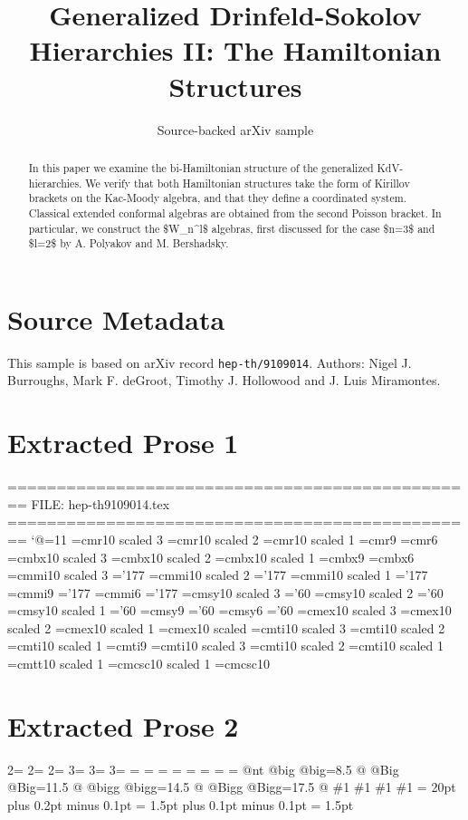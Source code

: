 \documentclass[11pt]{article}
\title{Generalized Drinfeld-Sokolov Hierarchies II: The Hamiltonian Structures}
\author{Source-backed arXiv sample}
\date{}
\begin{document}
\maketitle
\begin{abstract}
In this paper we examine the bi-Hamiltonian structure of the generalized KdV-hierarchies. We verify that both Hamiltonian structures take the form of Kirillov brackets on the Kac-Moody algebra, and that they define a coordinated system. Classical extended conformal algebras are obtained from the second Poisson bracket. In particular, we construct the \$W\_n\textasciicircum{}l\$ algebras, first discussed for the case \$n=3\$ and \$l=2\$ by A. Polyakov and M. Bershadsky.
\end{abstract}
\section{Source Metadata}
This sample is based on arXiv record \texttt{hep-th/9109014}. Authors: Nigel J. Burroughs, Mark F. deGroot, Timothy J. Hollowood and J. Luis Miramontes.
\section{Extracted Prose 1}
================================================ FILE: hep-th9109014.tex ================================================ `@=11 =cmr10 scaled 3 =cmr10 scaled 2 =cmr10 scaled 1 =cmr9 =cmr6 =cmbx10 scaled 3 =cmbx10 scaled 2 =cmbx10 scaled 1 =cmbx9 =cmbx6 =cmmi10 scaled 3 ='177 =cmmi10 scaled 2 ='177 =cmmi10 scaled 1 ='177 =cmmi9 ='177 =cmmi6 ='177 =cmsy10 scaled 3 ='60 =cmsy10 scaled 2 ='60 =cmsy10 scaled 1 ='60 =cmsy9 ='60 =cmsy6 ='60 =cmex10 scaled 3 =cmex10 scaled 2 =cmex10 scaled 1 =cmex10 scaled =cmti10 scaled 3 =cmti10 scaled 2 =cmti10 scaled 1 =cmti9 =cmti10 scaled 3 =cmti10 scaled 2 =cmti10 scaled 1 =cmtt10 scaled 1 =cmcsc10 scaled 1 =cmcsc10
\section{Extracted Prose 2}
2= 2= 2= 3= 3= 3= = = = = = = = = @nt @big @big=8.5 @ @Big @Big=11.5 @ @bigg @bigg=14.5 @ @Bigg @Bigg=17.5 @ \#1 \#1 \#1 \#1 = 20pt plus 0.2pt minus 0.1pt = 1.5pt plus 0.1pt minus 0.1pt = 1.5pt
\end{document}
